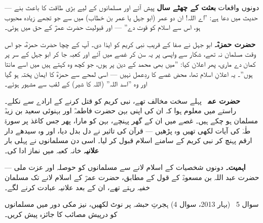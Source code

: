 \begin{hal}
دونوں واقعات \textbf{بعثت کے چھٹے سال} پیش آئے اور مسلمانوں کے لیے بڑی طاقت
کا باعث بنے --- حدیث میں دعا ہے: ''اے اللہ! ان دو عمر (ابو جہل یا عمر بن
خطاب) میں سے جو تجھے زیادہ محبوب ہو، اس سے اسلام کو قوت دے'' --- اور قبولیت
حضرت عمرؓ کے حق میں ہوئی۔

\medskip
\textbf{حضرت حمزہؓ۔} ابو جہل نے صفا کے قریب نبی کریم \saw کو ایذا دی۔ آپ
\saw کے چچا حضرت حمزہؓ، جو اس وقت مسلمان نہ تھے، شکار سے واپسی پر یہ سن کر
غصے میں آئے اور کعبہ جا کر ابو جہل کے سر پر کمان دے ماری، پھر اعلان کیا:
''میں بھی محمد \saw کے دین پر ہوں، جو کچھ وہ کہتے ہیں میں اسے مانتا ہوں''۔
یہ اعلانِ اسلام تھا، محض غصے کا ردِعمل نہیں --- اسی لمحے سے حمزہؓ کا ایمان
پختہ ہو گیا اور وہ ''اسد اللہ'' (اللہ کا شیر) کے لقب سے مشہور ہوئے۔

\medskip
\textbf{حضرت عمرؓ۔} پہلے سخت مخالف تھے، نبی کریم \saw کو قتل کرنے کے ارادے
سے نکلے۔ راستے میں معلوم ہوا کہ ان کی اپنی بہن حضرت فاطمہؓ اور بہنوئی سعید
بن زیدؓ مسلمان ہو چکے ہیں۔ غصے میں ان کے گھر پہنچے، بہن کو مارا، پھر جس
کاغذ پر سورۃ طٰہٰ کی آیات لکھی تھیں وہ پڑھیں --- قرآن کی تاثیر نے دل بدل
دیا، اور وہ سیدھے دار ارقم پہنچ کر نبی کریم \saw کے سامنے اسلام قبول کر
لیا۔ اسی دن مسلمانوں نے پہلی بار \textbf{علانیہ} خانہ کعبہ میں نماز ادا کی۔

\medskip
\textbf{اہمیت۔} دونوں شخصیات کے اسلام لانے سے مسلمانوں کو حوصلہ اور عزت
ملی --- حضرت عبد اللہ بن مسعودؓ کے قول کے مطابق، حضرت عمرؓ کے اسلام لانے
تک مسلمان خفیہ رہتے تھے، ان کے بعد علانیہ عبادت کرنے لگے۔
\end{hal}

\begin{sawal}{سوال \textenglish{5} \ \textnormal{\small(بہار \textenglish{2013}، سوال \textenglish{4})}}
ہجرتِ حبشہ پر نوٹ لکھیں، نیز مکی دور میں مسلمانوں کو درپیش مصائب کا جائزہ
پیش کریں۔
\end{sawal}


